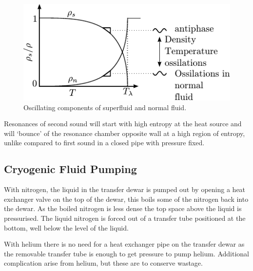 \begin{figure}[htbp]
\centering
\includegraphics{pics/normalossilations.pdf}
\caption{Oscillating components of superfluid and normal fluid.\label{fig:normalossilations}}
\end{figure}

Resonances of second sound will start with high entropy at the
heat source and will `bounce' of the resonance chamber opposite wall at a 
high region of entropy, unlike compared to  first sound in 
a closed pipe with pressure fixed.


\subsection{Cryogenic Fluid Pumping \label{sec:cryopumping}}
With nitrogen, the liquid in the transfer dewar is pumped
out by opening a heat exchanger valve on the
top of the dewar, this boils some of the nitrogen back into the 
dewar.
As the boiled nitrogen is less dense the top space above the
liquid is pressurised. The liquid nitrogen is forced out of a
transfer tube positioned at the bottom, well below the level of the liquid.

With helium there is no need for a heat exchanger pipe on the transfer dewar as
the removable transfer tube is enough to get pressure to pump helium.
Additional complication arise from helium, but these are to conserve wastage.










